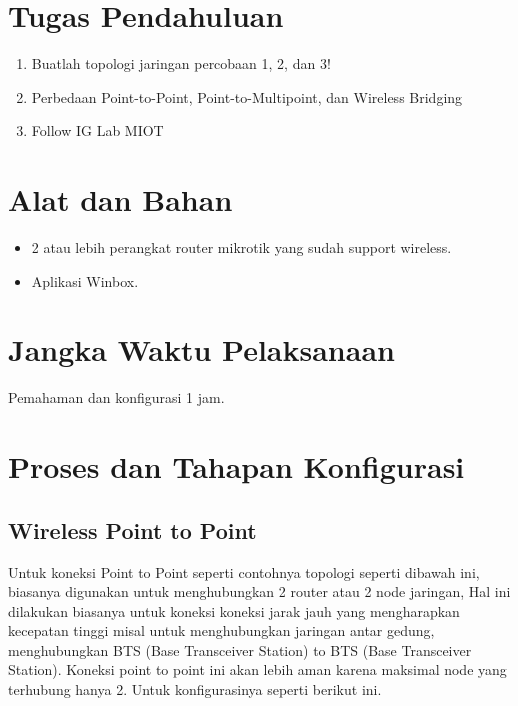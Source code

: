 \section{Tugas Pendahuluan}
\begin{enumerate}
	\item Buatlah topologi jaringan percobaan 1, 2, dan 3!
	\item Perbedaan Point-to-Point, Point-to-Multipoint, dan Wireless Bridging
	\item Follow IG Lab MIOT
\end{enumerate}

\section{Alat dan Bahan}
\begin{itemize}[label=$\bullet$, itemsep=-1pt, leftmargin=*]
	\item 2 atau lebih perangkat router mikrotik yang sudah support wireless.
	\item Aplikasi Winbox.
\end{itemize}

\section{Jangka Waktu Pelaksanaan}
Pemahaman dan konfigurasi 1 jam.

\section{Proses dan Tahapan Konfigurasi}
\subsection{Wireless Point to Point}
Untuk koneksi Point to Point seperti contohnya topologi seperti dibawah ini, biasanya
digunakan untuk menghubungkan 2 router atau 2 node jaringan, Hal ini dilakukan biasanya
untuk koneksi koneksi jarak jauh yang mengharapkan kecepatan tinggi misal untuk
menghubungkan jaringan antar gedung, menghubungkan BTS (Base Transceiver Station) to
BTS (Base Transceiver Station). Koneksi point to point ini akan lebih aman karena maksimal
node yang terhubung hanya 2. Untuk konfigurasinya seperti berikut ini.

